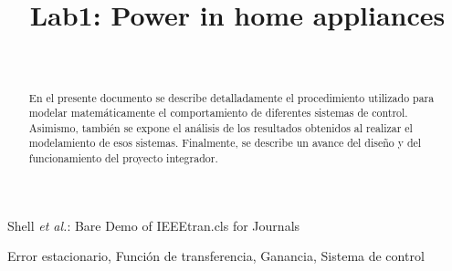 \documentclass[journal]{IEEEtran}
\begin{document}
\title{\textbf{Lab1: Power in home appliances}}

\author{
  \\
}


%
{Shell \MakeLowercase{\textit{et al.}}: Bare Demo of IEEEtran.cls 
for Journals}
	
\maketitle
	
\begin{abstract}
En el presente documento se describe detalladamente el
procedimiento utilizado para modelar matem\'aticamente el
comportamiento de diferentes sistemas de control.
Asimismo, tambi\'en se expone el an\'alisis de los resultados
obtenidos al realizar el modelamiento de esos sistemas.
Finalmente, se describe un avance del 
dise\~no y del funcionamiento del proyecto integrador.   
\end{abstract}


\begin{IEEEkeywords}  
Error estacionario, Funci\'on de transferencia, 
Ganancia, Sistema de control  
\end{IEEEkeywords}


\IEEEpeerreviewmaketitle



\end{document}
